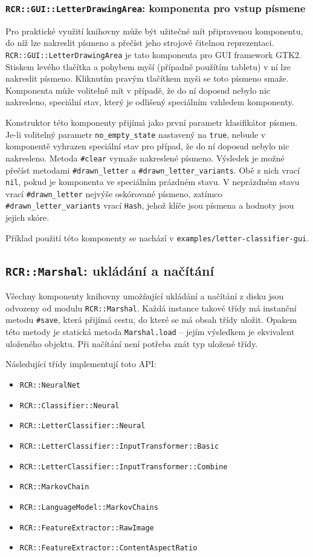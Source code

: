 \documentclass[a4paper]{article}
\begin{document}
\subsubsection{\texttt{RCR::GUI::LetterDrawingArea}: komponenta pro vstup
písmene}
Pro praktické využití knihovny může být užitečné mít připravenou komponentu,
do níž lze nakreslit písmeno a přečíst jeho strojově čitelnou reprezentaci.
\texttt{RCR::GUI::LetterDrawingArea} je tato komponenta pro GUI framework GTK2.
Stiskem levého tlačítka a pohybem myší (případně použítím tabletu) v ní lze
nakreslit písmeno. Kliknutím pravým tlačítkem myši se toto písmeno smaže.
Komponenta může volitelně mít v případě, že do ní doposud nebylo nic nakresleno,
speciální stav, který je odlišený speciálním vzhledem komponenty.

Konstruktor této komponenty přijímá jako první parametr klasifikátor písmen.
Je-li volitelný parametr \texttt{no\_empty\_state} nastavený na \texttt{true},
nebude v komponentě vyhrazen speciální stav pro případ, že do ní doposud nebylo
nic nakresleno.
Metoda \texttt{\#clear} vymaže nakreslené písmeno. Výsledek je možné přečíst
metodami \texttt{\#drawn\_letter} a \texttt{\#drawn\_letter\_variants}.
Obě z nich vrací \texttt{nil}, pokud je komponenta ve speciálním prázdném stavu.
V neprázdném stavu vrací \texttt{\#drawn\_letter} nejvýše oskórované písmeno,
zatímco \texttt{\#drawn\_letter\_variants} vrací \texttt{Hash}, jehož klíče jsou
písmena a hodnoty jsou jejich skóre.

Příklad použití této komponenty se nachází v \texttt{examples/letter-classifier-gui}.

\subsection{\texttt{RCR::Marshal}: ukládání a načítání}
Všechny komponenty knihovny umožňující ukládání a načítání z disku jsou odvozeny
od modulu \texttt{RCR::Marshal}. Každá instance takové třídy má instanční metodu
\texttt{\#save}, která přijímá cestu, do které se má obsah třídy uložit. Opakem
této metody je statická metoda \texttt{Marshal.load} -- jejím výsledkem je
ekvivalent uloženého objektu. Při načítání není potřeba znát typ uložené třídy.

Následující třídy implementují toto API:
\begin{itemize}
\item \texttt{RCR::NeuralNet}
\item \texttt{RCR::Classifier::Neural}
\item \texttt{RCR::LetterClassifier::Neural}
\item \texttt{RCR::LetterClassifier::InputTransformer::Basic}
\item \texttt{RCR::LetterClassifier::InputTransformer::Combine}
\item \texttt{RCR::MarkovChain}
\item \texttt{RCR::LanguageModel::MarkovChains}
\item \texttt{RCR::FeatureExtractor::RawImage}
\item \texttt{RCR::FeatureExtractor::ContentAspectRatio}
\end{itemize}
\end{document}

